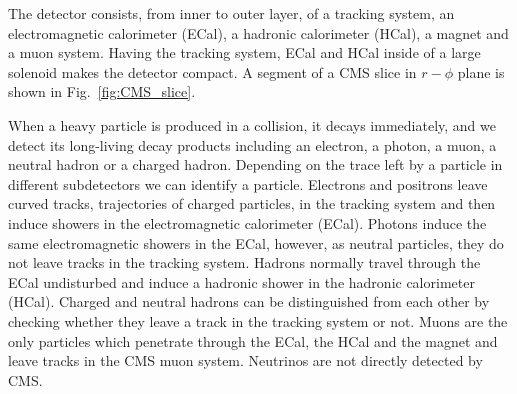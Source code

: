 The detector consists, from inner to outer layer,  of a tracking system, an electromagnetic calorimeter (ECal), a hadronic calorimeter (HCal), a magnet and a muon system. Having the tracking system, ECal and HCal inside of a large solenoid makes the detector compact. A segment of a CMS slice in $r-\phi$ plane is shown in Fig.~\ref{fig:CMS_slice}.

When a heavy particle is produced in a collision, it decays immediately, and we detect its long-living decay products including an electron, a photon, a muon, a neutral hadron or a charged hadron. Depending on the trace left by a particle in different subdetectors we can identify a particle. Electrons and positrons leave curved tracks, trajectories of charged particles, in the tracking system and then induce showers in the electromagnetic calorimeter (ECal). Photons induce the same electromagnetic showers in the ECal, however, as neutral particles, they do not leave tracks in the tracking system. Hadrons normally travel through the ECal undisturbed and induce a hadronic shower in the hadronic calorimeter (HCal). Charged and neutral hadrons can be distinguished from each other by checking whether they leave a track in the tracking system or not. Muons are the only particles which penetrate through the ECal, the HCal and the magnet and leave tracks in the CMS muon system. Neutrinos are not directly detected by CMS.   

